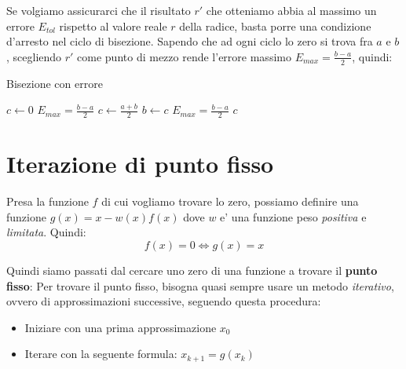 \documentclass{report}
\begin{document}
\vspace{3mm}
Se volgiamo assicurarci che il risultato $ r' $ che otteniamo abbia al massimo un errore $ E_{tol} $ rispetto al valore reale $ r $ della radice, basta porre una condizione d'arresto nel ciclo di bisezione. Sapendo che ad ogni ciclo lo zero si trova fra $ a $ e $ b $, scegliendo $ r' $ come punto di mezzo rende l'errore massimo $ E_{max} = \frac{b-a}{2} $, quindi:

\vspace{3mm}
\begin{algorithm}[H]
\caption{Bisezione con errore}
\SetAlgoLined
\SetNoFillComment
\vspace{3mm}
$c \leftarrow 0$\;
$ E_{max} = \frac{b-a}{2} $\;
 {
    $ c \gets \frac{a+b}{2} $\;
     {
      $ b \gets c $
    }
    $ E_{max} = \frac{b-a}{2} $
}
\Return $ c $
\end{algorithm}

\section{Iterazione di punto fisso}
Presa la funzione $ f $ di cui vogliamo trovare lo zero, possiamo definire una funzione $ g(x) = x-w(x)f(x) $ dove $ w $ e' una funzione peso \textit{positiva} e \textit{limitata}. Quindi:
\[
  f(x) = 0 \iff g(x) = x
\]

\begin{figure}[H]
  \centering
  \begin{subfigure}[b]{0.45\textwidth}
      
  \end{subfigure}
  \begin{subfigure}[b]{0.45\textwidth}
      
  \end{subfigure}
\end{figure}
Quindi siamo passati dal cercare uno zero di una funzione a trovare il \textbf{punto fisso}:
Per trovare il punto fisso, bisogna quasi sempre usare un metodo \textit{iterativo}, ovvero di approssimazioni successive, seguendo questa procedura:
\begin{itemize}
\item Iniziare con una prima approssimazione $ x_0 $
\item Iterare con la seguente formula: $ x_{k+1} = g(x_{k}) $
\end{itemize}
\end{document}
